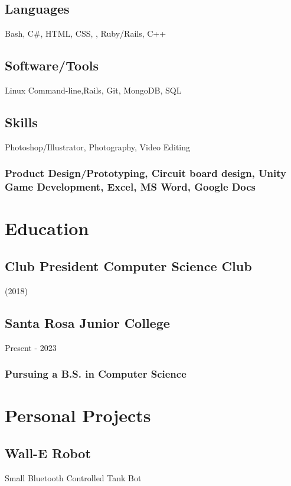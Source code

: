 \documentclass{article}
\begin{document}
		\subsection{Languages}
		Bash,  C\#, HTML, CSS, , Ruby/Rails, C++
		\vspace{-2mm}
		
		\subsection{Software/Tools}
		Linux Command-line,Rails, Git, MongoDB, SQL
		\vspace{-3mm}
		\subsection{Skills}Photoshop/Illustrator, Photography, Video Editing
		\vspace{-3mm}
		\subsubsection{Product Design/Prototyping, Circuit board design,  Unity Game Development, Excel, MS Word, Google Docs}
		\vspace{-3mm}
    		
    		    		
	\section{Education}
        \subsection{Club President  Computer Science Club}  (2018)
        \vspace{-2mm}   
         
        \subsection{Santa Rosa Junior College} Present - 2023 
        \vspace{-2mm}
            \subsubsection{Pursuing a B.S. in Computer Science}
\section{Personal Projects}

	\subsection{Wall-E Robot}Small Bluetooth Controlled Tank Bot
    	\vspace{-3mm}
\end{document}
